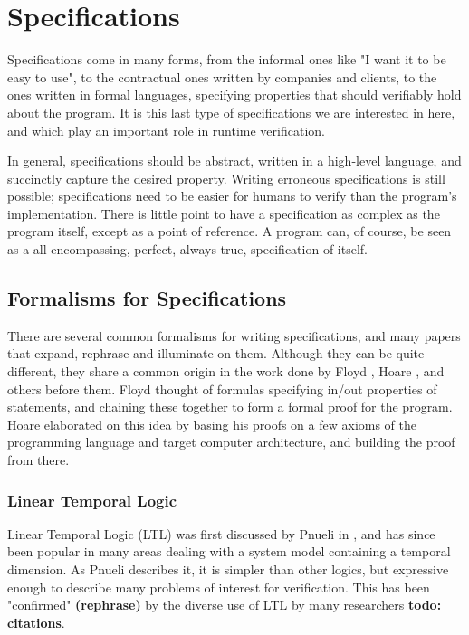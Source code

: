 \documentclass[a4paper,11pt]{kth-mag}
\newcommand{\todo}[1]{\textbf{todo: #1}}
\newcommand{\rephrase}{\textbf{(rephrase)} }
\begin{document}
\section{Specifications} \label{section-specifications}

Specifications come in many forms, from the informal ones like "I want it to be
easy to use", to the contractual ones written by companies and clients, to the
ones written in formal languages, specifying properties that should verifiably
hold about the program. It is this last type of specifications we are
interested in here, and which play an important role in runtime verification.

In general, specifications should be abstract, written in a high-level
language, and succinctly capture the desired property. Writing erroneous
specifications is still possible; specifications need to be easier for humans
to verify than the program's implementation. There is little point to have a
specification as complex as the program itself, except as a point of reference.
A program can, of course, be seen as a all-encompassing, perfect, always-true,
specification of itself.


\subsection{Formalisms for Specifications}

There are several common formalisms for writing specifications, and many papers
that expand, rephrase and illuminate on them. Although they can be quite
different, they share a common origin in the work done by Floyd \cite{floyd67},
Hoare \cite{hoare69}, and others before them.  Floyd thought of formulas
specifying in/out properties of statements, and chaining these together to form
a formal proof for the program. Hoare elaborated on this idea by basing his
proofs on a few axioms of the programming language and target computer
architecture, and building the proof from there.

\subsubsection{Linear Temporal Logic}

Linear Temporal Logic (LTL) was first discussed by Pnueli in \cite{pnueli77},
and has since been popular in many areas dealing with a system model containing
a temporal dimension. As Pnueli describes it, it is simpler than other logics,
but expressive enough to describe many problems of interest for verification.
This has been "confirmed" \rephrase by the diverse use of LTL by many
researchers \todo{citations}.
\end{document}

